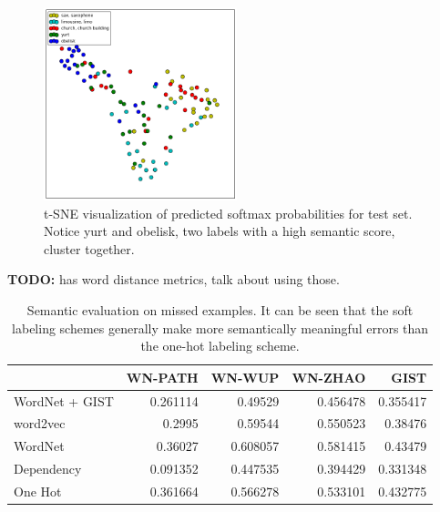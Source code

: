\begin{figure}[!tb]
  \centering
  \includegraphics[width=0.5\textwidth]{figs/tsne.png}
  \caption{
      t-SNE visualization of predicted softmax probabilities for test set.
      Notice yurt and obelisk, two labels with a high semantic score, cluster
      together.
  }
  \label{fig:tsne}
\end{figure}


\textbf{TODO:} \cite{budanitsky2006evaluating} has word distance metrics, talk
about using those.

\begin{table}[t]
    \centering
    \begin{tabular}{lrrrr}
         & WN-PATH & WN-WUP & WN-ZHAO & GIST\\
        \hline
        WordNet + GIST & 0.261114 & 0.49529 & 0.456478 & 0.355417\\
        word2vec & 0.2995 & 0.59544 & 0.550523 & 0.38476\\
        WordNet & 0.36027 & 0.608057 & 0.581415 & 0.43479\\
        Dependency & 0.091352 & 0.447535 & 0.394429 & 0.331348\\
        One Hot & 0.361664 & 0.566278 & 0.533101 & 0.432775\\
    \end{tabular}
  \label{tbl:semantic_misses}
  \caption{
      Semantic evaluation on missed examples. It can be seen that the soft
      labeling schemes generally make more semantically meaningful errors than
      the one-hot labeling scheme.
  }
\end{table}


%
